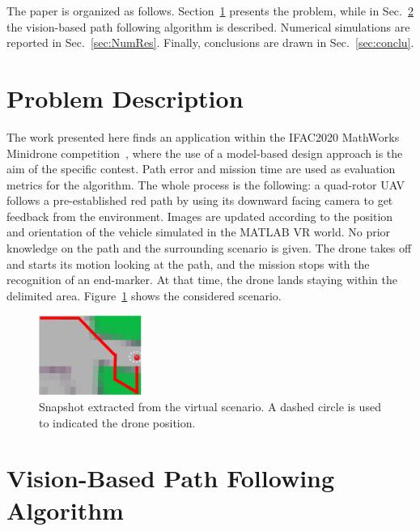 \documentclass[a4paper,twocolumn,10pt]{article}
\begin{document}
    The paper is organized as follows. Section~\ref{sec:probDesc} presents the problem, while in Sec.~\ref{sec:VisBasedFollow} the vision-based path following algorithm is 
    described. Numerical simulations are reported in Sec.~\ref{sec:NumRes}. Finally, conclusions are drawn in Sec.~\ref{sec:conclu}. 

    \section{Problem Description}
    \label{sec:probDesc}

    The work presented here finds an application within the IFAC2020 MathWorks Minidrone competition~\cite{bibItem19}, where the use of a model-based design approach is the aim of the specific contest. Path error and mission time are used as evaluation metrics for the algorithm. The whole process is the following: a quad-rotor UAV follows a pre-established red path by using its downward facing camera to get feedback from the environment. Images are updated according to the position and orientation of the vehicle simulated in the MATLAB VR world. No prior knowledge on the path and the surrounding scenario is given. The drone takes off and starts its  motion looking at the path, and the mission stops with the recognition of an end-marker. At that time, the drone lands staying within the delimited area. 
    Figure~\ref{fig:fig2track} shows the considered scenario. 

    \begin{figure}
        \centering
        \includegraphics[width=0.3\textwidth]{pics/fig2_track.png}
        \caption{Snapshot extracted from the virtual scenario. A dashed circle is used to indicated the drone position.}
        \label{fig:fig2track}
    \end{figure}

    \section{Vision-Based Path Following Algorithm}
    \label{sec:VisBasedFollow}
\end{document}
